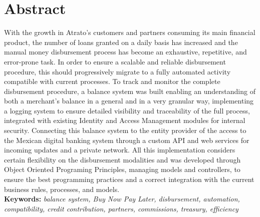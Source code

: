 
\chapter*{Abstract}

With the growth in Atrato’s customers and partners consuming its main financial product, the number of loans granted on a daily basis has increased and the manual money disbursement process has become an exhaustive, repetitive, and error-prone task. 
In order to ensure a scalable and reliable disbursement procedure, this should progressively migrate to a fully automated activity compatible with current processes.
To track and monitor the complete disbursement procedure, a balance system was built enabling an understanding of both a merchant's balance in a general and in a very granular way, implementing a logging system to ensure detailed visibility and traceability of the full process, integrated with existing Identity and Access Management modules for internal security.
 Connecting this balance system to the entity provider of the access to the Mexican digital banking system through a custom API and web services for incoming updates and a private network. All this implementation considers certain flexibility on the disbursement modalities and was developed through Object Oriented Programing Principles, managing models and controllers, to ensure the best programming practices and a correct integration with the current business rules, processes, and models.\\

 \textbf{Keywords: }\textit{balance system, Buy Now Pay Later, disbursement, automation, compatibility, credit contribution, partners, commissions, treasury, efficiency}